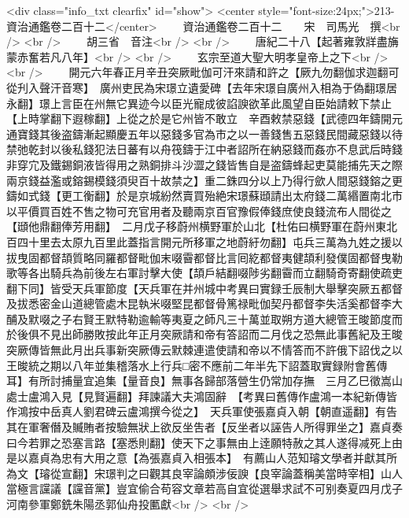 <div class="info_txt clearfix" id="show">
<center style="font-size:24px;">213-資治通鑑卷二百十二</center>
  　　資治通鑑卷二百十二　　宋　司馬光　撰<br />
<br />
　　胡三省　音注<br />
<br />
　　唐紀二十八【起著雍敦牂盡㫋蒙赤奮若凡八年】<br />
<br />
　　玄宗至道大聖大明孝皇帝上之下<br />
<br />
　　開元六年春正月辛丑突厥毗伽可汗來請和許之【厥九勿翻伽求迦翻可從刋入聲汗音寒】　廣州吏民為宋璟立遺愛碑【去年宋璟自廣州入相為于偽翻璟居永翻】璟上言臣在州無它異迹今以臣光寵成彼諂諛欲革此風望自臣始請敕下禁止【上時掌翻下遐稼翻】上從之於是它州皆不敢立　辛酉敕禁惡錢【武德四年鑄開元通寶錢其後盗鑄漸起顯慶五年以惡錢多官為市之以一善錢售五惡錢民間藏惡錢以待禁弛乾封以後私錢犯法日蕃有以舟筏鑄于江中者詔所在納惡錢而姦亦不息武后時錢非穿宂及鐵錫銅液皆得用之熟銅排斗沙澀之錢皆售自是盗鑄蜂起吏莫能捕先天之際兩京錢益濫或鎔錫模錢須臾百十故禁之】重二銖四分以上乃得行歛人間惡錢鎔之更鑄如式錢【更工衡翻】於是京城紛然賣買殆絶宋璟蘇頲請出太府錢二萬緡置南北市以平價買百姓不售之物可充官用者及聽兩京百官豫假俸錢庶使良錢流布人間從之【頲他鼎翻俸芳用翻】　二月戊子移蔚州横野軍於山北【杜佑曰横野軍在蔚州東北百四十里去太原九百里此蓋指言開元所移軍之地蔚紆勿翻】屯兵三萬為九姓之援以拔曳固都督頡質略同羅都督毗伽末啜霫都督比言囘紇都督夷健頡利發僕固都督曳勒歌等各出騎兵為前後左右軍討擊大使【頡戶結翻啜陟劣翻霫而立翻騎奇寄翻使疏吏翻下同】皆受天兵軍節度【天兵軍在并州城中考異曰實録壬辰制大舉擊突厥五都督及拔悉密金山道總管處木昆執米啜堅昆都督骨篤禄毗伽契丹都督李失活奚都督李大酺及默啜之子右賢王默特勒逾輸等夷夏之師凡三十萬並取朔方道大總管王晙節度而於後俱不見出師勝敗按此年正月突厥請和帝有答詔而二月伐之恐無此事舊紀及王晙突厥傳皆無此月出兵事新突厥傳云默棘連遣使請和帝以不情答而不許俄下詔伐之以王晙統之期以八年並集稽落水上行兵□密不應前二年半先下詔蓋取實録附會舊傳耳】有所討捕量宜追集【量音良】無事各歸部落營生仍常加存撫　三月乙巳徵嵩山處士盧鴻入見【見賢遍翻】拜諫議大夫鴻固辭　【考異曰舊傳作盧鴻一本紀新傳皆作鴻按中岳真人劉君碑云盧鴻撰今從之】　天兵軍使張嘉貞入朝【朝直遥翻】有告其在軍奢僭及贓賄者按驗無狀上欲反坐吿者【反坐者以誣告人所得罪坐之】嘉貞奏曰今若罪之恐塞言路【塞悉則翻】使天下之事無由上逹願特赦之其人遂得减死上由是以嘉貞為忠有大用之意【為張嘉貞入相張本】　有薦山人范知璿文學者并獻其所為文【璿從宣翻】宋璟判之曰觀其良宰論頗涉佞諛【良宰論蓋稱美當時宰相】山人當極言讜議【讜音黨】豈宜偷合苟容文章若高自宜從選舉求試不可别奏夏四月戊子河南參軍鄭銑朱陽丞郭仙舟投匭獻<br />
<br />
